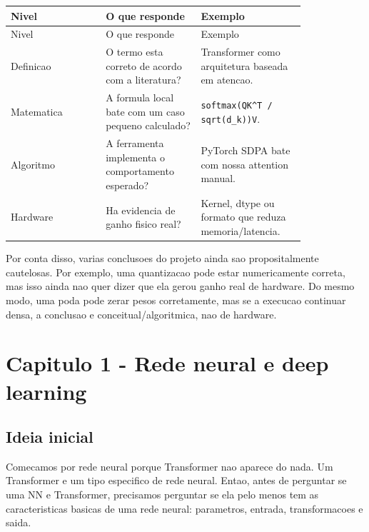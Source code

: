 \begin{longtable}{@{}>{\RaggedRight\arraybackslash}p{0.273\linewidth}>{\RaggedRight\arraybackslash}p{0.273\linewidth}>{\RaggedRight\arraybackslash}p{0.273\linewidth}@{}}
\toprule
Nivel & O que responde & Exemplo \\
\midrule
\endfirsthead
\toprule
Nivel & O que responde & Exemplo \\
\midrule
\endhead
Definicao & O termo esta correto de acordo com a literatura? & Transformer como arquitetura baseada em atencao. \\
Matematica & A formula local bate com um caso pequeno calculado? & \texttt{softmax(QK\textasciicircum{}T /\allowbreak{} sqrt(d\_\allowbreak{}k))V}. \\
Algoritmo & A ferramenta implementa o comportamento esperado? & PyTorch SDPA bate com nossa attention manual. \\
Hardware & Ha evidencia de ganho fisico real? & Kernel, dtype ou formato que reduza memoria/latencia. \\
\bottomrule
\end{longtable}







Por conta disso, varias conclusoes do projeto ainda sao propositalmente cautelosas. Por exemplo, uma quantizacao pode estar numericamente correta, mas isso ainda nao quer dizer que ela gerou ganho real de hardware. Do mesmo modo, uma poda pode zerar pesos corretamente, mas se a execucao continuar densa, a conclusao e conceitual/algoritmica, nao de hardware.



\section{Capitulo 1 - Rede neural e deep learning}



\subsection{Ideia inicial}







Comecamos por rede neural porque Transformer nao aparece do nada. Um Transformer e um tipo especifico de rede neural. Entao, antes de perguntar se uma NN e Transformer, precisamos perguntar se ela pelo menos tem as caracteristicas basicas de uma rede neural: parametros, entrada, transformacoes e saida.






